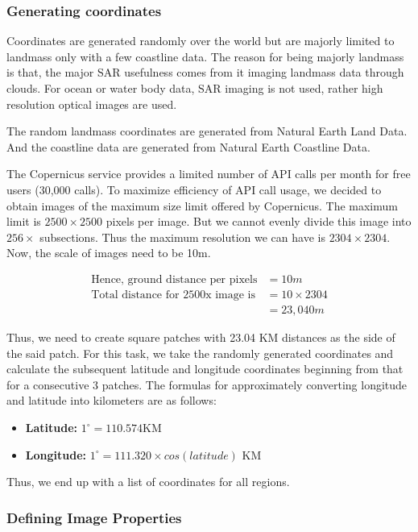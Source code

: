 \subsubsection{Generating coordinates}

Coordinates are generated randomly over the world but are majorly limited to landmass only with a few coastline data. The reason for being majorly landmass is that, the major SAR usefulness comes from it imaging landmass data through clouds. For ocean or water body data, SAR imaging is not used, rather high resolution optical images are used.

The random landmass coordinates are generated from Natural Earth Land Data\cite{naturalearthland}. And the coastline data are generated from Natural Earth Coastline Data\cite{naturalearthcoast}.

The Copernicus service provides a limited number of API calls per month for free users (30,000 calls). To maximize efficiency of API call usage, we decided to obtain images of the maximum size limit offered by Copernicus. The maximum limit is $2500\times2500$ pixels per image. But we cannot evenly divide this image into $256\times$ subsections. Thus the maximum resolution we can have is $2304\times2304$. Now, the scale of images need to be 10m.

\begin{align*}
    \text{Hence, ground distance per pixels} &= 10m \\
    \text{Total distance for 2500x image is} &= 10\times2304 \\
    &= 23,040m
\end{align*}

Thus, we need to create square patches with 23.04 KM distances as the side of the said patch. For this task, we take the randomly generated coordinates and calculate the subsequent latitude and longitude coordinates beginning from that for a consecutive 3 patches. The formulas for approximately converting longitude and latitude into kilometers are as follows:

\begin{itemize}
    \item \textbf{Latitude: } $1^\circ = 110.574$KM
    \item \textbf{Longitude:} $1^\circ = 111.320\times cos(latitude)$ KM
\end{itemize}

Thus, we end up with a list of coordinates for all regions.

\subsubsection{Defining Image Properties}

